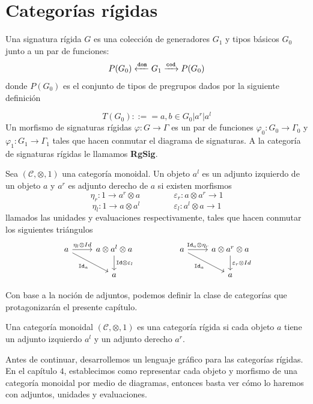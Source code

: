 \documentclass[../main.tex]{subfiles}
\begin{document}
    \section{Categorías rígidas}
        
	\begin{dfn}
		Una signatura rígida $G$ es una colección de generadores $G_1$ y tipos básicos $G_0$ junto a un par de funciones: \\
		$$P(G_0) \xleftarrow{\tt{dom}} G_1 \xrightarrow{\tt{cod}} P(G_0)$$
		donde $P(G_0)$ es el conjunto de tipos de pregrupos dados por la siguiente definición
		
		$$T(G_0) ::== a, b \in G_0 | a^r | a^l$$
		Un morfismo de signaturas rígidas $\varphi : G \to \Gamma$ es un par de funciones $\varphi_0 : G_0 \to \Gamma_0$ y $\varphi_1 : G_1 \to \Gamma_1$ tales que hacen conmutar el diagrama de signaturas. A la categoría de signaturas rígidas le llamamos \textbf{RgSig}.
	\end{dfn}
	\begin{dfn}
		Sea $(\mathcal{C}, \otimes, 1)$ una categoría monoidal. Un objeto $a^l$ es un adjunto izquierdo de un objeto $a$ y $a^r$ es adjunto derecho de $a$ si existen morfismos
		$$\eta_r: 1 \to a^r \otimes a \qquad \qquad \varepsilon_r : a \otimes a^r \to 1$$
		$$\eta_l: 1 \to a \otimes a^l \qquad \qquad \varepsilon_l : a^l \otimes a \to 1$$
		llamados las unidades y evaluaciones respectivamente, tales que hacen conmutar los siguientes triángulos 
            \begin{equation}
                \label{eq:snake}
    		\begin{tikzcd}
    			a \arrow{r}{\eta_l \otimes Id} \arrow[swap]{dr}{\id_a} & a \otimes a^l \otimes a \arrow{d}{\id \otimes \varepsilon_l}
    			& & 
    			a \arrow{r}{\id_a \otimes \eta_r} \arrow[swap]{dr}{\id_a} & a \otimes a^r \otimes a \arrow{d}{\varepsilon_r \otimes Id}\\
    			& a
    			& & &
    			a
    		\end{tikzcd}
            \end{equation}
	\end{dfn}
	\noindent Con base a la noción de adjuntos, podemos definir la clase de categorías que protagonizarán el presente capítulo. 
	\begin{dfn}
		Una categoría monoidal $(\mathcal{C}, \otimes, 1)$ es una categoría rígida si cada objeto $a$ tiene un adjunto izquierdo $a^l$ y un adjunto derecho $a^r$. 
	\end{dfn}
	\noindent Antes de continuar, desarrollemos un lenguaje gráfico para las categorías rígidas. En el capítulo $4$, establecimos como representar cada objeto y morfismo de una categoría monoidal por medio de diagramas, entonces basta ver cómo lo haremos con adjuntos, unidades y evaluaciones. \\
\end{document}
